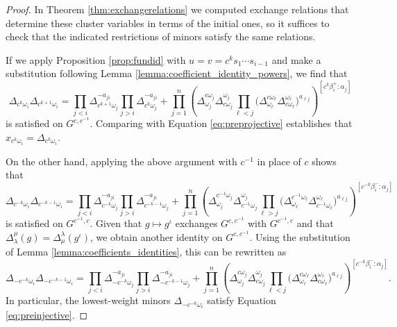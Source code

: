\documentclass[12pt]{amsart}
\theoremstyle{remark}
\numberwithin{equation}{section}
\begin{document}
\begin{proof}
In Theorem \ref{thm:exchangerelations} we computed exchange relations that determine these cluster variables in terms of the initial ones, so it suffices to check that the indicated restrictions of minors satisfy the same relations.

If we apply Proposition \ref{prop:fundid} with $u = v = c^k s_1 \cdots s_{i-1}$ and make a substitution following Lemma \ref{lemma:coefficient_identity_powers}, we find that 
\begin{equation}
\Delta_{c^k\omega_i}\Delta_{c^{k+1}\omega_i} = 
    \prod_{j<i}\Delta_{c^{k+1}\omega_j}^{-a_{ji}}
    \prod_{j>i}\Delta_{c^k\omega_j}^{-a_{ji}}
    +
    \prod_{j=1}^n\left( 
      \Delta^{c \omega_j}_{\omega_j}
      \Delta^{\omega_j}_{ c\omega_j} 
      \prod_{\ell<j}\big(
        \Delta^{c \omega_\ell}_{\omega_\ell} 
        \Delta^{\omega_\ell}_{c \omega_\ell}
      \big)^{a_{\ell j}}
    \right)^{[c^k\beta_i^+:\alpha_j]}
\end{equation}
is satisfied on $G^{c,c^{-1}}$. 
Comparing with Equation \ref{eq:preprojective} establishes that $x_{c^k\omega_i} = \Delta_{c^k \omega_i}$.

On the other hand, applying the above argument with $c^{-1}$ in place of $c$ shows that  
\begin{equation} \Delta_{c^{-k}\omega_i} \Delta_{c^{-k-1}\omega_i} = 
    \prod_{j<i}\Delta_{c^{-k}\omega_j}^{-a_{ji}}
    \prod_{j>i}\Delta_{c^{-k-1}\omega_j}^{-a_{ji}}
    +
    \prod_{j=1}^n\left( 
      \Delta^{c^{-1} \omega_j}_{\omega_j}
      \Delta^{\omega_j}_{ c^{-1}\omega_j} 
      \prod_{\ell>j}\big(
        \Delta^{c^{-1} \omega_\ell}_{\omega_\ell} 
        \Delta^{\omega_\ell}_{c^{-1} \omega_\ell}
      \big)^{a_{\ell j}}
    \right)^{[c^{-k}\beta_i^-:\alpha_j]}
\end{equation}
is satisfied on $G^{c^{-1},c}$. Given that $g \mapsto g^\iota$ exchanges $G^{c,c^{-1}}$ with $G^{c^{-1},c}$ and that $\Delta_\lambda^\mu(g) = \Delta_\mu^\lambda(g^\iota)$, we obtain another identity on $G^{c,c^{-1}}$. Using the substitution of Lemma \ref{lemma:coefficients_identities}, this can be rewritten as
\begin{equation}
\Delta_{-c^{-k}\omega_i}\Delta_{-c^{-k-1}\omega_i} =
    \prod_{j<i}\Delta_{-c^{-k}\omega_j}^{-a_{ji}}
    \prod_{j>i}\Delta_{-c^{-k-1}\omega_j}^{-a_{ji}}
    +
    \prod_{j=1}^n\left( 
      \Delta^{c \omega_j}_{\omega_j}
      \Delta^{\omega_j}_{ c\omega_j} 
      \prod_{\ell<j}\big(
        \Delta^{c \omega_\ell}_{\omega_\ell} 
        \Delta^{\omega_\ell}_{c \omega_\ell}
      \big)^{a_{\ell j}}
    \right)^{[c^{-k}\beta_i^-:\alpha_j]}.
\end{equation}
In particular, the lowest-weight minors $\Delta_{-c^{-k}\omega_i}$ satisfy Equation \ref{eq:preinjective}.


\end{proof}
\end{document}
